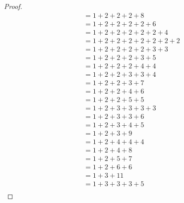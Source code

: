 \begin{proof}
\begin{align*}
           & = 1 + 2 + 2 + 2 + 8                                                   \\
           & = 1 + 2 + 2 + 2 + 2 + 6                                               \\
           & = 1 + 2 + 2 + 2 + 2 + 2 + 4                                           \\
           & = 1 + 2 + 2 + 2 + 2 + 2 + 2 + 2                                       \\
           & = 1 + 2 + 2 + 2 + 2 + 3 + 3                                           \\
           & = 1 + 2 + 2 + 2 + 3 + 5                                               \\
           & = 1 + 2 + 2 + 2 + 4 + 4                                               \\
           & = 1 + 2 + 2 + 3 + 3 + 4                                               \\
           & = 1 + 2 + 2 + 3 + 7                                                   \\
           & = 1 + 2 + 2 + 4 + 6                                                   \\
           & = 1 + 2 + 2 + 5 + 5                                                   \\
           & = 1 + 2 + 3 + 3 + 3 + 3                                               \\
           & = 1 + 2 + 3 + 3 + 6                                                   \\
           & = 1 + 2 + 3 + 4 + 5                                                   \\
           & = 1 + 2 + 3 + 9                                                       \\
           & = 1 + 2 + 4 + 4 + 4                                                   \\
           & = 1 + 2 + 4 + 8                                                       \\
           & = 1 + 2 + 5 + 7                                                       \\
           & = 1 + 2 + 6 + 6                                                       \\
           & = 1 + 3 + 11                                                          \\
           & = 1 + 3 + 3 + 3 + 5                                                   \\

\end{align*}
\end{proof}
